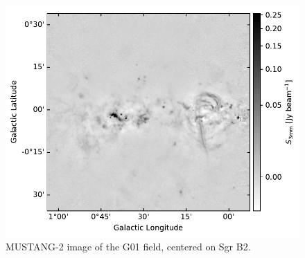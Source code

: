 \documentclass[twocolumn]{aastex62}
\newcommand{\MUSTANG}{MUSTANG-2\xspace}
\begin{document}




\begin{figure}[htp]
\includegraphics[width=17cm]{figures/G01_overview.pdf}
\caption{\MUSTANG image of the G01 field, centered on Sgr B2.
}
\label{fig:g01overview}
\end{figure}
\end{document}
